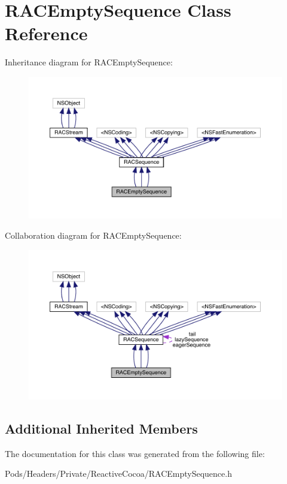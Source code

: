 \hypertarget{interface_r_a_c_empty_sequence}{}\section{R\+A\+C\+Empty\+Sequence Class Reference}
\label{interface_r_a_c_empty_sequence}


Inheritance diagram for R\+A\+C\+Empty\+Sequence\+:\nopagebreak
\begin{figure}[H]
\begin{center}
\leavevmode
\includegraphics[width=350pt]{interface_r_a_c_empty_sequence__inherit__graph}
\end{center}
\end{figure}


Collaboration diagram for R\+A\+C\+Empty\+Sequence\+:\nopagebreak
\begin{figure}[H]
\begin{center}
\leavevmode
\includegraphics[width=350pt]{interface_r_a_c_empty_sequence__coll__graph}
\end{center}
\end{figure}
\subsection*{Additional Inherited Members}


The documentation for this class was generated from the following file\+:\begin{DoxyCompactItemize}
\item 
Pods/\+Headers/\+Private/\+Reactive\+Cocoa/R\+A\+C\+Empty\+Sequence.\+h\end{DoxyCompactItemize}
